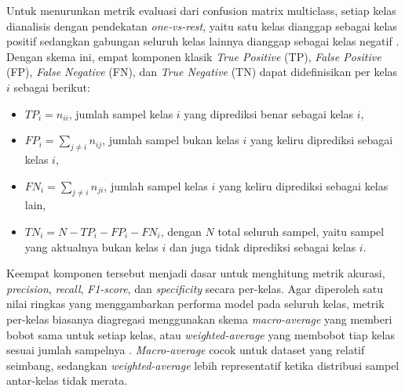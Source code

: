 Untuk menurunkan metrik evaluasi dari confusion matrix multiclass, setiap kelas dianalisis dengan pendekatan \textit{one-vs-rest}, yaitu satu kelas dianggap sebagai kelas positif sedangkan gabungan seluruh kelas lainnya dianggap sebagai kelas negatif \cite{Raschka2020}. Dengan skema ini, empat komponen klasik \textit{True Positive} (TP), \textit{False Positive} (FP), \textit{False Negative} (FN), dan \textit{True Negative} (TN) dapat didefinisikan per kelas $i$ sebagai berikut:

\begin{itemize}
	\item $TP_i = n_{ii}$, jumlah sampel kelas $i$ yang diprediksi benar sebagai kelas $i$,
	\item $FP_i = \sum_{j \neq i} n_{ij}$, jumlah sampel bukan kelas $i$ yang keliru diprediksi sebagai kelas $i$,
	\item $FN_i = \sum_{j \neq i} n_{ji}$, jumlah sampel kelas $i$ yang keliru diprediksi sebagai kelas lain,
	\item $TN_i = N - TP_i - FP_i - FN_i$, dengan $N$ total seluruh sampel, yaitu sampel yang aktualnya bukan kelas $i$ dan juga tidak diprediksi sebagai kelas $i$.
\end{itemize}

Keempat komponen tersebut menjadi dasar untuk menghitung metrik akurasi, \textit{precision}, \textit{recall}, \textit{F1-score}, dan \textit{specificity} secara per-kelas. Agar diperoleh satu nilai ringkas yang menggambarkan performa model pada seluruh kelas, metrik per-kelas biasanya diagregasi menggunakan skema \textit{macro-average} yang memberi bobot sama untuk setiap kelas, atau \textit{weighted-average} yang membobot tiap kelas sesuai jumlah sampelnya \cite{Raschka2020}. \textit{Macro-average} cocok untuk dataset yang relatif seimbang, sedangkan \textit{weighted-average} lebih representatif ketika distribusi sampel antar-kelas tidak merata.\par

